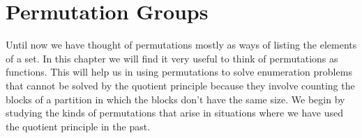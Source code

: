 \documentclass[10pt,]{book}
\theoremstyle{plain}
\theoremstyle{definition}
\numberwithin{equation}{chapter}
\begin{document}
\section[{Permutation Groups}]{Permutation Groups}\label{sec_groups-permgroups}
Until now we have thought of permutations mostly as ways of listing the elements of a set. In this chapter we will find it very useful to think of permutations as functions. This will help us in using permutations to solve enumeration problems that cannot be solved by the quotient principle because they involve counting the blocks of a partition in which the blocks don't have the same size. We begin by studying the kinds of permutations that arise in situations where we have used the quotient principle in the past.%
\typeout{************************************************}
\typeout{************************************************}
\end{document}
